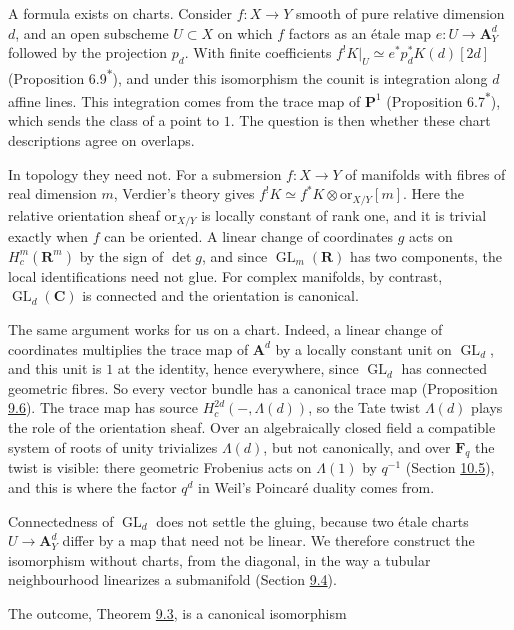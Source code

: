 \documentclass[11pt]{article}
\newcommand{\bpout}[1]{#1\textsuperscript{\hyperlink{bp-outside}{\ensuremath{\ast}}}}
\begin{document}
A formula exists on charts. Consider \(f:X\to Y\) smooth of pure relative dimension \(d\), and an open subscheme \(U\subset X\) on which \(f\) factors as an étale map \(e:U\to\mathbf A^d_Y\) followed by the projection \(p_d\). With finite coefficients \(f^!K|_U\simeq e^*p_d^*K(d)[2d]\) (Proposition \bpout{6.9}), and under this isomorphism the counit is integration along \(d\) affine lines. This integration comes from the trace map of \(\mathbf P^1\) (Proposition \bpout{6.7}), which sends the class of a point to \(1\). The question is then whether these chart descriptions agree on overlaps.

In topology they need not. For a submersion \(f:X\to Y\) of manifolds with fibres of real dimension \(m\), Verdier's theory gives \(f^!K\simeq f^*K\otimes\mathrm{or}_{X/Y}[m]\). Here the relative orientation sheaf \(\mathrm{or}_{X/Y}\) is locally constant of rank one, and it is trivial exactly when \(f\) can be oriented. A linear change of coordinates \(g\) acts on \(H^m_c(\mathbf R^m)\) by the sign of \(\det g\), and since \(\operatorname{GL}_m(\mathbf R)\) has two components, the local identifications need not glue. For complex manifolds, by contrast, \(\operatorname{GL}_d(\mathbf C)\) is connected and the orientation is canonical.

The same argument works for us on a chart. Indeed, a linear change of coordinates multiplies the trace map of \(\mathbf A^d\) by a locally constant unit on \(\operatorname{GL}_d\), and this unit is \(1\) at the identity, hence everywhere, since \(\operatorname{GL}_d\) has connected geometric fibres. So every vector bundle has a canonical trace map (Proposition \hyperref[bp21]{9.6}). The trace map has source \(H^{2d}_c(-,\Lambda(d))\), so the Tate twist \(\Lambda(d)\) plays the role of the orientation sheaf. Over an algebraically closed field a compatible system of roots of unity trivializes \(\Lambda(d)\), but not canonically, and over \(\mathbf F_q\) the twist is visible: there geometric Frobenius acts on \(\Lambda(1)\) by \(q^{-1}\) (Section \hyperref[bp154]{10.5}), and this is where the factor \(q^d\) in Weil's Poincaré duality comes from.

Connectedness of \(\operatorname{GL}_d\) does not settle the gluing, because two étale charts \(U\to\mathbf A^d_Y\) differ by a map that need not be linear. We therefore construct the isomorphism without charts, from the diagonal, in the way a tubular neighbourhood linearizes a submanifold (Section \hyperref[bp24]{9.4}).

The outcome, Theorem \hyperref[bp11]{9.3}, is a canonical isomorphism
\end{document}
